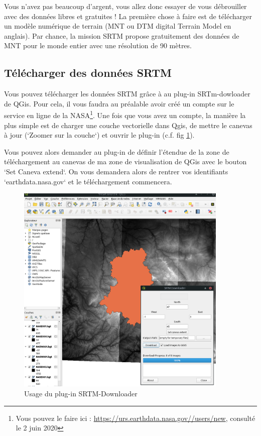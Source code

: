 \documentclass[a4paper, 11pt]{article}
\begin{document}
  Vous n'avez pas beaucoup d'argent, vous allez donc essayer de vous débrouiller avec des données libres et gratuites ! La première chose à faire est de télécharger un modèle numérique de terrain (MNT ou DTM digital Terrain Model en anglais). Par chance, la mission SRTM propose gratuitement des données de MNT pour le monde entier avec une résolution de 90 mètres.

  \subsection{Télécharger des données SRTM}
  Vous pouvez télécharger les données SRTM grâce à au plug-in SRTm-dowloader de QGis. Pour cela, il vous faudra au préalable avoir créé un compte sur le service en ligne de la NASA\footnote{Vous pouvez le faire ici : \url{https://urs.earthdata.nasa.gov//users/new}, consulté le 2 juin 2020}. Une fois que vous avez un compte, la manière la plus simple est de charger une couche vectorielle dans Qgis, de mettre le canevas à jour (`Zoomer sur la couche`) et ouvrir le plug-in (c.f. fig \ref{fig:srtmDownloader}).

  Vous pouvez alors demander au plug-in de définir l'étendue de la zone de téléchargement au canevas de ma zone de visualisation de QGis avec le bouton `Set Caneva extend`. On vous demandera alors de rentrer vos identifiants `earthdata.nasa.gov` et le téléchargement commencera.

  \begin{figure}
  \centering
  \includegraphics[width=0.9\textwidth]{img/srtm_downloader.png}
  \caption{Usage du plug-in SRTM-Downloader}\label{fig:srtmDownloader}
  \end{figure}
\end{document}

